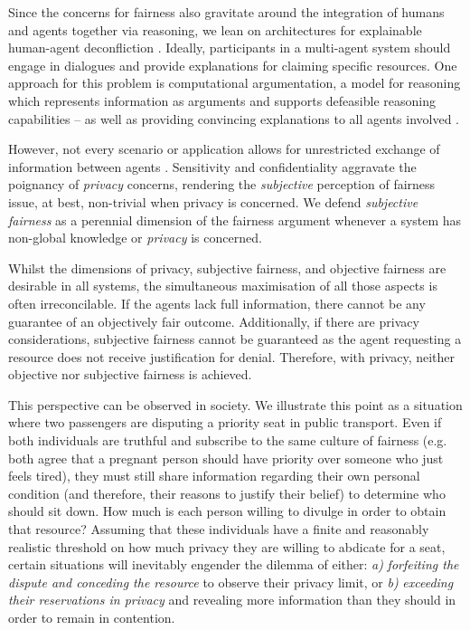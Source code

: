 \documentclass[acmsmall]{custom-arxiv}  %
\begin{document}
Since the concerns for fairness also gravitate around the integration of humans and agents together via reasoning, we lean on architectures for explainable human-agent deconfliction \citep{Raymond2020Culture-BasedDeconfliction}. Ideally, participants in a multi-agent system should engage in dialogues \citep{Jakobovits1999DialecticFrameworks, Modgil2009ArgumentationGoals} and provide explanations for claiming specific resources. One approach for this problem is computational argumentation, a model for reasoning which represents information as arguments and supports defeasible reasoning capabilities -- as well as providing convincing explanations to all agents involved \citep{Dung1995OnGames, Amgoud2009UsingDecisions, Fan2015OnArgumentation}.


However, not every scenario or application allows for unrestricted exchange of information between agents \citep{dwork_algorithmic_2014}. Sensitivity and confidentiality aggravate the poignancy of \textit{privacy} concerns, rendering the \textit{subjective} perception of fairness issue, at best, non-trivial when privacy is concerned. We defend \textit{subjective fairness} as a perennial dimension of the fairness argument whenever a system has non-global knowledge or \textit{privacy} is concerned.

Whilst the dimensions of privacy, subjective fairness, and objective fairness are desirable in all systems, the simultaneous maximisation of all those aspects is often irreconcilable. If the agents %
lack full information, there cannot be any guarantee of an objectively fair outcome. Additionally, if there are privacy considerations, subjective fairness cannot be guaranteed as the agent requesting a resource does not receive justification for denial. Therefore, with privacy, neither objective nor subjective fairness is achieved.

This perspective can be observed in society. We illustrate this point as a situation where two passengers are disputing a priority seat in public transport. Even if both individuals are truthful and subscribe to the same culture of fairness (e.g. both agree that a pregnant person should have priority over someone who just feels tired), they must still share information regarding their own personal condition (and therefore, their reasons to justify their belief) to determine who should sit down. How much is each person willing to divulge in order to obtain that resource? Assuming that these individuals have a finite and reasonably realistic threshold on how much privacy they are willing to abdicate for a seat, certain situations will inevitably engender the dilemma of either: \textit{a)} \textit{forfeiting the dispute and conceding the resource} to observe their privacy limit, or \textit{b)} \textit{exceeding their reservations in privacy} and revealing more information than they should in order to remain in contention. 
\end{document}
